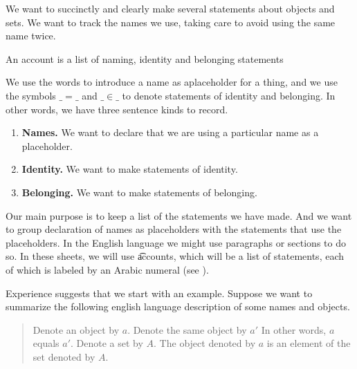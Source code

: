 

We want to succinctly and clearly make several statements about objects and sets. We want to track the names we use, taking care to avoid using the same name twice.


An account is a list of naming, identity and belonging statements

We use the words  to introduce a name as aplaceholder for a thing, and we use the symbols $\_=\_$ and $\_\in\_$ to denote statements of identity and belonging.
In other words, we have three sentence kinds to record.

\begin{enumerate}

  \item
  \textbf{Names.}
  We want to declare that we are using a particular name as a placeholder.

  \item
  \textbf{Identity.}
  We want to make statements of identity.

  \item
  \textbf{Belonging.}
  We want to make statements of belonging.

\end{enumerate}

Our main purpose is to keep a list of the statements we have made.
And we want to group declaration of names as placeholders with the statements that use the placeholders.
In the English language we might use paragraphs or sections to do so.
In these sheets, we will use \t{accounts}, which will be a list of statements, each of which is labeled by an Arabic numeral (see ).

Experience suggests that we start with an example.
Suppose we want to summarize the following english language description of some names and objects.

\begin{quote}
Denote an object by $a$.
Denote the same object by $a'$
In other words, $a$ equals $a'$.
Denote a set by $A$.
The object denoted by $a$ is an element of the set denoted by $A$.
\end{quote}

